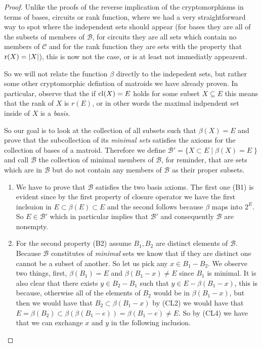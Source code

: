 \begin{proof}
    Unlike the proofs of the reverse implication of the cryptomorphisms in terms of bases, circuits or rank function, where we had a very straightforward way to spot where the independent sets should appear (for bases they are all of the subsets of members of $\mathcal{B}$, for circuits they are all sets which contain no members of $\mathcal{C}$ and for the rank function they are sets with the property that $\text{r}(X) = |X|$), this is now not the case, or is at least not immediatly appearent.

    So we will not relate the function $\beta$ directly to the indepedent sets, but rather some other cryptomorphic defintion of matroids we have already proven. In particular, observe that the if $\mathrm{cl}(X) = E$ holds for some subset $X \subseteq E$ this means that the rank of $X$ is $r(E)$, or in other words the maximal indpendent set inside of $X$ is a \textit{basis.}

    So our goal is to look at the collection of all subsets such that $\beta(X)= E$ and prove that the subcollection of its \textit{minimal sets} satisfies the axioms for the collection of bases of a matroid. Therefore we define $\mathcal{B}' = \{X \subset E\; |\; \beta(X) = E\;\}$ and call $\mathcal{B}$ the collection of minimal members of $\mathcal{B}$, for reminder, that are sets which are in $\mathcal{B}$ but do not contain any members of $\mathcal{B}$ as their proper subsets.


\begin{enumerate}

\item We have to prove that $\mathcal{B}$ satisfies the two basis axioms. The first one (B1) is evident since by the first property of closure operator we have the first inclsuion in $E\subset\beta(E) \subset E$ and the second follows because $\beta$ maps into $2^E$. So $E \in \mathcal{B}'$ which in particular implies that $\mathcal{B}'$ and consequently $\mathcal{B}$ are nonempty.

\item
    For the second property (B2) assume $B_1, B_2$ are distinct elements of $\mathcal{B}.$ Because $\mathcal{B}$ constitutes of \textit{minimal} sets we know that if they are distinct one cannot be a subset of another. So let us pick any $x \in B_1 - B_2$.
    We observe two things, first, $\beta(B_1) = E$ and $\beta(B_1 - x) \neq E$ since $B_1$ is minimal. It is also clear that there exists $y \in B_2 - B_1$ such that $y \in E - \beta(B_1 - x)$, this is because, otherwise all of the elements of $B_2$ would be in $\beta(B_1-x)$, but then we would have that $B_2 \subset \beta(B_1 - x)$ by (CL2) we would have that $E = \beta(B_2)\subset \beta(\beta(B_1 - e)) = \beta(B_1 - e) \neq E$. So by (CL4) we have that we can exchange $x$ and $y$ in the following inclusion.
    

\end{enumerate}
\end{proof}
